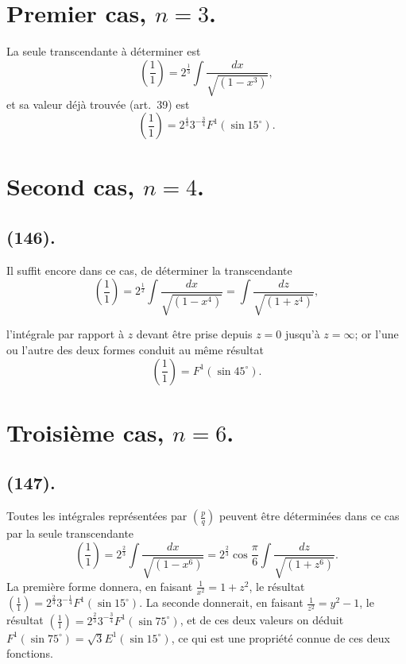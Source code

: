 \documentclass{article}
\begin{document}
\section*{Premier cas, $n=3$.}

La seule transcendante à déterminer est
\[ \left(\frac{1}{1}\right)=2^{\frac{1}{3}}\int\frac{dx}{\sqrt{(1-x^{3})}}, \]
et sa valeur déjà trouvée (art.\ 39) est
\[ \left(\frac{1}{1}\right)=2^{\frac{4}{3}}3^{-\frac{3}{4}}F^{1}(\sin 15^{\circ}). \]

\section*{Second cas, $n=4$.}

\subsection*{(146).}

Il suffit encore dans ce cas, de déterminer la transcendante
\[ \left(\frac{1}{1}\right)=2^{\frac{1}{2}}\int\frac{dx}{\sqrt{(1-x^{4})}}=\int\frac{dz}{\sqrt{(1+z^{4})}}, \]

l'intégrale par rapport à $z$ devant être prise depuis $z=0$ jusqu'à $z=\infty$; or l'une ou l'autre des deux formes conduit au même résultat
\[ \left(\frac{1}{1}\right)=F^{1}(\sin 45^{\circ}). \]

\section*{Troisième cas, $n=6$.}

\subsection*{(147).}

Toutes les intégrales représentées par $\left(\frac{p}{q}\right)$ peuvent être déterminées dans ce cas par la seule transcendante
\[ \left(\frac{1}{1}\right)=2^{\frac{2}{3}}\int\frac{dx}{\sqrt{(1-x^{6})}}=2^{\frac{2}{3}}\cos\frac{\pi}{6}\int\frac{dz}{\sqrt{(1+z^{6})}}. \]
La première forme donnera, en faisant $\frac{1}{x^{2}}=1+z^{2}$, le résultat $\left(\frac{1}{1}\right)=2^{\frac{2}{3}}3^{-\frac{1}{4}}F^{1}(\sin 15^{\circ})$. La seconde donnerait, en faisant $\frac{1}{z^{2}}=y^{2}-1$, le résultat $\left(\frac{1}{1}\right)=2^{\frac{2}{3}}3^{-\frac{3}{4}}F^{1}(\sin 75^{\circ})$, et de ces deux valeurs on déduit $F^{1}(\sin 75^{\circ})=\sqrt{3}E^{1}(\sin 15^{\circ})$, ce qui est une propriété connue de ces deux fonctions.
\end{document}

